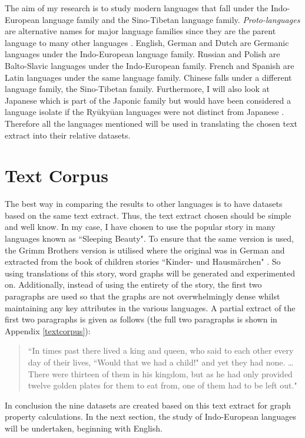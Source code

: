 The aim of my research is to study modern languages that fall under the Indo-European language family and the Sino-Tibetan language family. \emph{Proto-languages} are alternative names for major language families since they are the parent language to many other languages \cite{rowe2022concise}. English, German and Dutch are Germanic languages under the Indo-European language family. Russian and Polish are Balto-Slavic languages under the Indo-European family.  French and Spanish are Latin languages under the same language family. Chinese falls under a different language family, the Sino-Tibetan family. Furthermore, I will also look at Japanese which is part of the Japonic family but would have been considered a language isolate if the Ryūkyūan languages were not distinct from Japanese \cite{campbell2010language}. Therefore all the languages mentioned will be used in translating the chosen text extract into their relative datasets.

\section{Text Corpus}
The best way in comparing the results to other languages is to have datasets based on the same text extract. Thus, the text extract chosen should be simple and well know. In my case, I have chosen to use the popular story in many languages known as ``Sleeping Beauty". To ensure that the same version is used, the Grimm Brothers version is utilised where the original was in German and extracted from the book of children stories ``Kinder- und Hausmärchen" \cite{grimm1857kinder}. So using translations of this story, word graphs will be generated and experimented on.  Additionally, instead of using the entirety of the story, the first two paragraphs are used so that the graphs are not overwhelmingly dense whilst maintaining any key attributes in the various languages. A partial extract of the first two paragraphs is given as follows (the full two paragraphs is shown in Appendix \ref{textcorpus}):
\begin{quote}
``In times past there lived a king and queen, who said to each other every day of their lives, ``Would that we had a child!" and yet they had none. \dots There were thirteen of them in his kingdom, but as he had only provided twelve golden plates for them to eat from, one of them had to be left out."
\end{quote}
In conclusion the nine datasets are created based on this text extract for graph property calculations. In the next section, the study of Indo-European languages will be undertaken, beginning with English.


